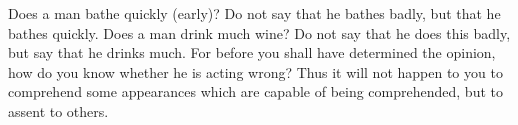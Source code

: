 Does a man bathe quickly (early)? Do not  say that he bathes badly, but that he
bathes quickly. Does a man drink much wine? Do not say that he does this badly,
but say that he drinks much. For  before you shall have determined the opinion,
how do you know  whether he is acting wrong? Thus it will  not happen to you to
comprehend some  appearances which  are capable of  being comprehended,  but to
assent to others.
